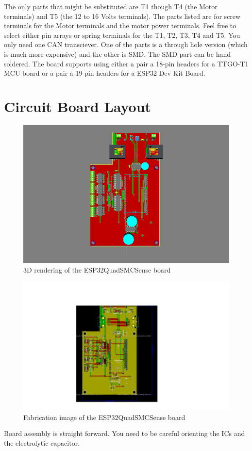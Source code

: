 The only parts that might be substituted are T1 though T4 (the Motor
terminals) and T5 (the 12 to 16 Volts terminals). The parts listed are for
screw terminals for the Motor terminals and the motor power terminals. Feel
free to select either pin arrays or spring terminals for the T1, T2, T3, T4
and T5. You only need one CAN transciever. One of the parts is a through hole
version (which is much more expensive) and the other is SMD. The SMD part can
be hand soldered. The board supports using either a pair a 18-pin headers for
a TTGO-T1 MCU board or a pair a 19-pin headers for a ESP32 Dev Kit Board.

\section{Circuit Board Layout}

\begin{figure}[hbpt]\begin{centering}%
\includegraphics[width=5in]{ESP32QuadSMCSense3DTop.png}
\caption{3D rendering of the ESP32QuadSMCSense board}
\end{centering}\end{figure}
\begin{figure}[hbpt]\begin{centering}%
\includegraphics[width=5in]{ESP32QuadSMCSense.png}
\caption{Fabrication image of the ESP32QuadSMCSense board}
\end{centering}\end{figure}
Board assembly is straight forward. You need to be careful orienting the ICs
and the electrolytic capacitor.

